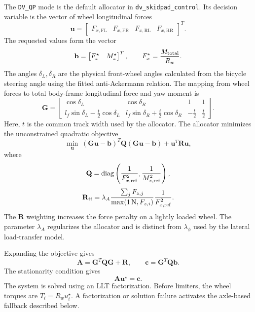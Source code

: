 \documentclass[11pt,a4paper]{article}
\newcommand{\FL}{\mathrm{FL}}
\newcommand{\FR}{\mathrm{FR}}
\newcommand{\RL}{\mathrm{RL}}
\newcommand{\RR}{\mathrm{RR}}
\begin{document}
The \texttt{DV\_QP} mode is the default allocator in
\texttt{dv\_skidpad\_control}. Its decision variable is the vector of wheel
longitudinal forces
\begin{equation}
\mathbf{u}=
\begin{bmatrix}
F_{x,\FL}&F_{x,\FR}&F_{x,\RL}&F_{x,\RR}
\end{bmatrix}^{T}.
\end{equation}
The requested values form the vector
\begin{equation}
\mathbf{b}=
\begin{bmatrix}
F_x^\star&M_z^\star
\end{bmatrix}^{T},
\qquad
F_x^\star=\frac{M_{\rm total}}{R_w}.
\end{equation}
The angles $\delta_L,\delta_R$ are the physical front-wheel angles calculated
from the bicycle steering angle using the fitted anti-Ackermann relation. The
mapping from wheel forces to total body-frame longitudinal force and yaw
moment is
\begin{equation}
\mathbf{G}=
\begin{bmatrix}
\cos\delta_L & \cos\delta_R & 1 & 1\\
l_f\sin\delta_L-\frac{t}{2}\cos\delta_L &
l_f\sin\delta_R+\frac{t}{2}\cos\delta_R &
-\frac{t}{2} & \frac{t}{2}
\end{bmatrix}.
\end{equation}
Here, \(t\) is the common track width used by the allocator.
The allocator minimizes the unconstrained quadratic objective
\begin{equation}
\min_{\mathbf{u}}\;
(\mathbf{G}\mathbf{u}-\mathbf{b})^T
\mathbf{Q}
(\mathbf{G}\mathbf{u}-\mathbf{b})
+\mathbf{u}^T\mathbf{R}\mathbf{u},
\end{equation}
where
\begin{equation}
\mathbf{Q}=
\operatorname{diag}\left(
\frac{1}{F_{x,\rm ref}^2},
\frac{1}{M_{z,\rm ref}^2}
\right),
\end{equation}
\begin{equation}
\mathbf{R}_{ii}=
\lambda_A
\frac{\sum_jF_{z,j}}{\max(\SI{1}{\newton},F_{z,i})}
\frac{1}{F_{x,\rm ref}^2}.
\end{equation}
The $\mathbf{R}$ weighting increases the force penalty on a lightly loaded
wheel. The parameter $\lambda_A$ regularizes the allocator and is distinct
from $\lambda_\phi$ used by the lateral load-transfer model.

Expanding the objective gives
\begin{equation}
\mathbf{A}=\mathbf{G}^T\mathbf{Q}\mathbf{G}+\mathbf{R},
\qquad
\mathbf{c}=\mathbf{G}^T\mathbf{Q}\mathbf{b}.
\end{equation}
The stationarity condition gives
\begin{equation}
\mathbf{A}\mathbf{u}^\star=\mathbf{c}.
\end{equation}
The system is solved using an LLT factorization. Before limiters, the wheel
torques are $T_i=R_wu_i^\star$. A factorization or solution failure activates
the axle-based fallback described below.
\end{document}
